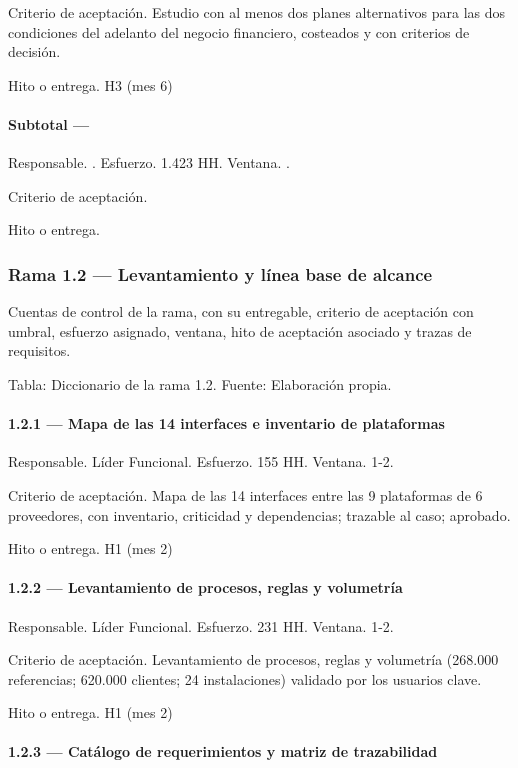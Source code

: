 \documentclass[11pt]{article}
\begin{document}
Criterio de aceptación. Estudio con al menos dos planes alternativos para las dos condiciones del adelanto del negocio financiero, costeados y con criterios de decisión.

Hito o entrega. H3 (mes 6)

\paragraph{Subtotal — }

Responsable. . Esfuerzo. 1.423 HH. Ventana. .

Criterio de aceptación.

Hito o entrega.

\subsubsection{Rama 1.2 — Levantamiento y línea base de alcance}

Cuentas de control de la rama, con su entregable, criterio de aceptación con umbral, esfuerzo asignado, ventana, hito de aceptación asociado y trazas de requisitos.

Tabla: Diccionario de la rama 1.2. Fuente: Elaboración propia.

\paragraph{1.2.1 — Mapa de las 14 interfaces e inventario de plataformas}

Responsable. Líder Funcional. Esfuerzo. 155 HH. Ventana. 1-2.

Criterio de aceptación. Mapa de las 14 interfaces entre las 9 plataformas de 6 proveedores, con inventario, criticidad y dependencias; trazable al caso; aprobado.

Hito o entrega. H1 (mes 2)

\paragraph{1.2.2 — Levantamiento de procesos, reglas y volumetría}

Responsable. Líder Funcional. Esfuerzo. 231 HH. Ventana. 1-2.

Criterio de aceptación. Levantamiento de procesos, reglas y volumetría (268.000 referencias; 620.000 clientes; 24 instalaciones) validado por los usuarios clave.

Hito o entrega. H1 (mes 2)

\paragraph{1.2.3 — Catálogo de requerimientos y matriz de trazabilidad}
\end{document}
